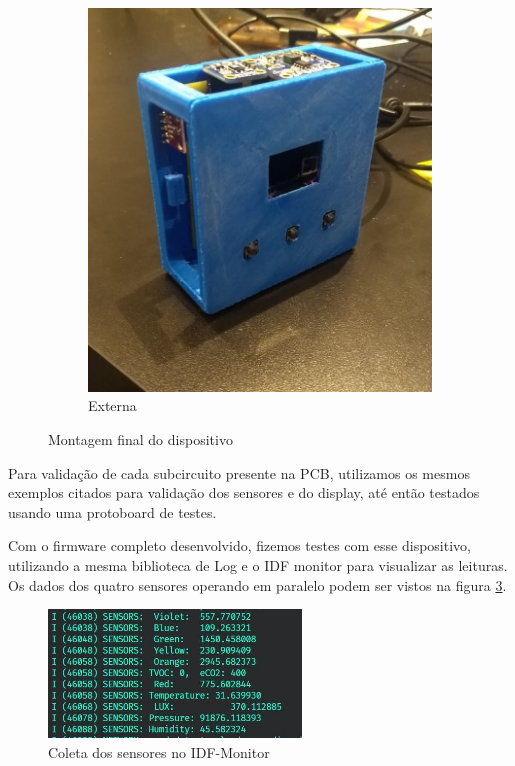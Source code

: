 \documentclass[../monografia.tex]{subfiles}
\begin{document}
\begin{figure}[h]
\begin{subfigure}{0.5\textwidth}
		\includegraphics[width=\textwidth]{montagem-final.jpg}
		\caption{Externa}
		\label{fig:externa}
	\end{subfigure}
	\caption{Montagem final do dispositivo}
	\label{fig:montagem-final}
\end{figure}

Para validação de cada subcircuito presente na PCB, utilizamos os mesmos exemplos citados para validação dos sensores e do display, até então testados usando uma protoboard de testes. 

Com o firmware completo desenvolvido, fizemos testes com esse dispositivo, utilizando a mesma biblioteca de Log e o IDF monitor para visualizar as leituras. Os dados dos quatro sensores operando em paralelo podem ser vistos na figura \ref{fig:monitor-sensors}.

\begin{figure}[h]
	\centering
	\includegraphics[width=0.6\textwidth]{monitor-sensors}
	\caption{Coleta dos sensores no IDF-Monitor}
	\label{fig:monitor-sensors}
\end{figure}
\end{document}
